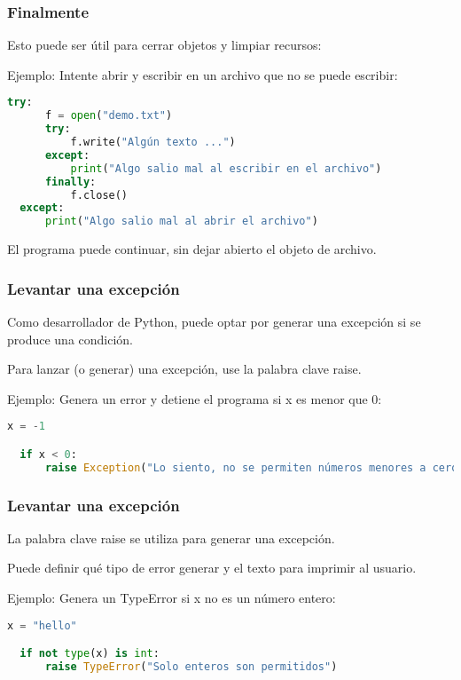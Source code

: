 \begin{frame}[fragile]
  \frametitle{Finalmente}

  Esto puede ser útil para cerrar objetos y limpiar recursos:

  \vspace{\baselineskip}
  Ejemplo: Intente abrir y escribir en un archivo que no se puede escribir:
  \begin{lstlisting}[language=Python]
  try:
      f = open("demo.txt")
      try:
          f.write("Algún texto ...")
      except:
          print("Algo salio mal al escribir en el archivo")
      finally:
          f.close()
  except:
      print("Algo salio mal al abrir el archivo")
  \end{lstlisting}

  \vspace{\baselineskip}
  El programa puede continuar, sin dejar abierto el objeto de archivo.
\end{frame}

\begin{frame}[fragile]
  \frametitle{Levantar una excepción}

  Como desarrollador de Python, puede optar por generar una excepción si
  se produce una condición.

  \vspace{\baselineskip}
  Para lanzar (o generar) una excepción, use la palabra clave
  \textcolor{codeKeyword}{raise}.

  \vspace{\baselineskip}
  Ejemplo: Genera un error y detiene el programa si x es menor que 0:
  \begin{lstlisting}[language=Python]
  x = -1

  if x < 0:
      raise Exception("Lo siento, no se permiten números menores a cero")
  \end{lstlisting}
\end{frame}

\begin{frame}[fragile]
  \frametitle{Levantar una excepción}

  La palabra clave \textcolor{codeKeyword}{raise} se utiliza para
  generar una excepción.

  \vspace{\baselineskip}
  Puede definir qué tipo de error generar y el texto para imprimir al usuario.

  \vspace{\baselineskip}
  Ejemplo: Genera un TypeError si x no es un número entero:
  \begin{lstlisting}[language=Python]
  x = "hello"

  if not type(x) is int:
      raise TypeError("Solo enteros son permitidos")
  \end{lstlisting}
\end{frame}

